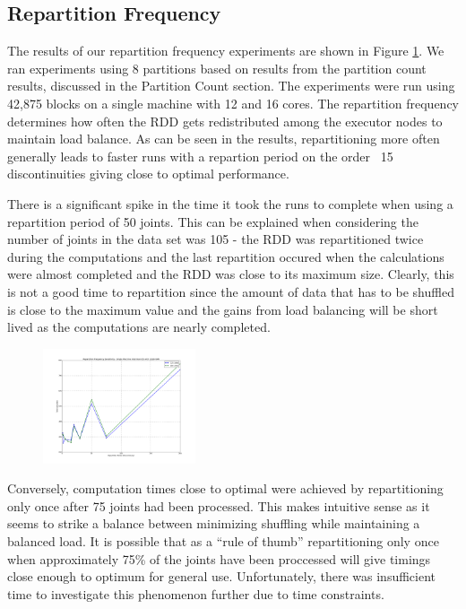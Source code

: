 \subsection{Repartition Frequency}
The results of our repartition frequency experiments are shown in Figure \ref{fig:FrequencySensitivity}. We ran experiments using 8 partitions based on results from the partition count results, discussed in the Partition Count section. The experiments were run using 42,875 blocks on a single machine with 12 and 16 cores. The repartition frequency determines how often the RDD gets redistributed among the executor nodes to maintain load balance. As can be seen in the results, repartitioning more often generally leads to faster runs with a repartion period on the order ~15 discontinuities giving close to optimal performance. \par

There is a significant spike in the time it took the runs to complete when using a repartition period of 50 joints. This can be explained when considering the number of joints in the data set was 105 - the RDD was repartitioned twice during the computations and the last repartition occured when the calculations were almost completed and the RDD was close to its maximum size. Clearly, this is not a good time to repartition since the amount of data that has to be shuffled is close to the maximum value and the gains from load balancing will be short lived as the computations are nearly completed. \par

\begin{figure}
  \centering
  \includegraphics[width=0.4\textwidth]{FrequencySensitivity} 
  \label{fig:FrequencySensitivity}           
\end{figure}

Conversely, computation times close to optimal were achieved by repartitioning only once after 75 joints had been processed. This makes intuitive sense as it seems to strike a balance between minimizing shuffling  while  maintaining a balanced load. It is possible that as a ``rule of thumb'' repartitioning only once when approximately 75\% of the joints have been proccessed will give timings close enough to optimum for general use. Unfortunately, there was insufficient time to investigate this phenomenon further due to time constraints. \par


